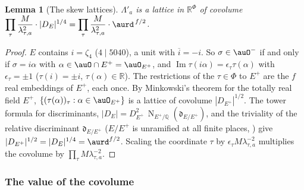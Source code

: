 \documentclass[10pt]{amsart}
\newtheorem{lemma}[theorem]{Lemma}
\theoremstyle{definition}
\theoremstyle{remark}
\newcommand{\R}{\mathbb R}
\newcommand{\Q}{\mathbb Q}
\newcommand{\Iml}{\operatorname{Im}}
\providecommand{\auPl}{\Phi}
\providecommand{\aubar}[1]{\overline{#1}}
\begin{document}
\begin{lemma}[The skew lattices]\label{pbv:vol-skew}
$\Lambda'_a$ is a lattice in $\R^{\auPl}$ of covolume $\displaystyle\prod_\tau\frac M{\lambda_{\tau,a}^2}\cdot
|D_E|^{1/4}=\prod_\tau\frac M{\lambda_{\tau,a}^2}\cdot\aurd^{\,f/2}$.
\end{lemma}
\begin{proof}
$E$ contains $i=\zeta_4$ ($4\mid5040$), a unit with $\aubar i=-i$. So $\sigma\in\auO^-$ if and only if
$\sigma=i\alpha$ with $\alpha\in\auO\cap E^+=\auO_{E^+}$, and $\Iml\tau(i\alpha)=\epsilon_\tau\tau(\alpha)$ with
$\epsilon_\tau=\pm1$ ($\tau(i)=\pm i$, $\tau(\alpha)\in\R$). The restrictions of the $\tau\in\auPl$ to $E^+$ are
the $f$ real embeddings of $E^+$, each once. By Minkowski's theorem for the totally real field $E^+$,
$\{(\tau(\alpha))_\tau:\alpha\in\auO_{E^+}\}$ is a lattice of covolume $|D_{E^+}|^{1/2}$. The tower formula
for discriminants, $|D_E|=D_{E^+}^{2}\,\operatorname N_{E^+/\Q}(\mathfrak d_{E/E^+})$, and the triviality of the
relative discriminant $\mathfrak d_{E/E^+}$ ($E/E^+$ is unramified at all finite places,
{\cite[\S14.1]{P46}}) give $|D_{E^+}|^{1/2}=|D_E|^{1/4}=\aurd^{f/2}$. Scaling the coordinate $\tau$ by
$\epsilon_\tau M\lambda_{\tau,a}^{-2}$ multiplies the covolume by $\prod_\tau M\lambda_{\tau,a}^{-2}$.
\end{proof}

\subsubsection{The value of the covolume}\label{pbv:ss-value}
\end{document}

